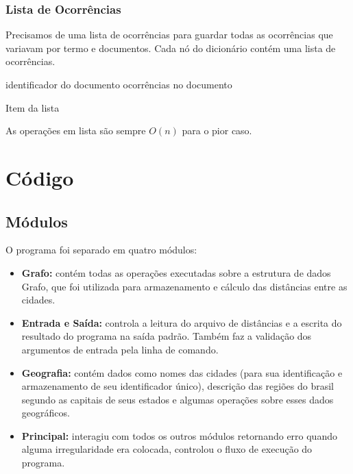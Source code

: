 \documentclass[12pt]{article}
\begin{document}
\subsubsection{Lista de Ocorrências}

Precisamos de uma lista de ocorrências para guardar todas as ocorrências que
variavam por termo e documentos. Cada nó do dicionário contém uma lista de
ocorrências.

\begin{algorithm}[h!]
\begin{footnotesize}
	identificador do documento\;
	ocorrências no documento\;
\caption{Item da lista}
\end{footnotesize}
\end{algorithm}

As operações em lista são sempre $O(n)$ para o pior caso.

\section{Código}

\subsection{Módulos}
O programa foi separado em quatro módulos:
\begin{itemize}
\item \textbf{Grafo:} contém todas as operações executadas sobre a 
estrutura de dados Grafo, que foi utilizada para armazenamento e cálculo
das distâncias entre as cidades.
\item \textbf{Entrada e Saída:} controla a leitura do arquivo de distâncias
e a escrita do resultado do programa na saída padrão. Também faz a validação dos 
argumentos de entrada pela linha de comando.
\item \textbf{Geografia:} contém dados como nomes das cidades (para sua identificação
e armazenamento de seu identificador único), descrição das regiões do brasil
segundo as capitais de seus estados e algumas operações sobre esses dados geográficos.
\item \textbf{Principal:} interagiu com todos os outros módulos retornando erro
quando alguma irregularidade era colocada, controlou o fluxo de execução do
programa.
\end{itemize}
\end{document}
